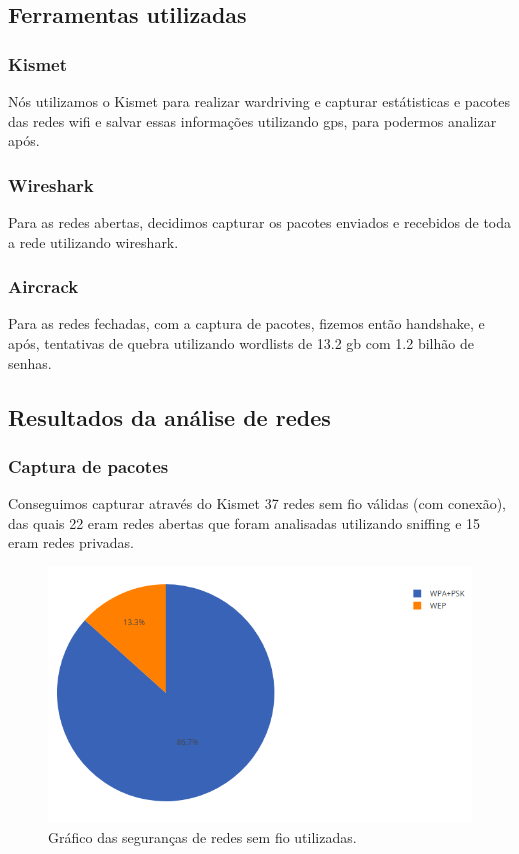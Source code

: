 \documentclass[
	article,			%
	12pt,				%
	oneside,			%
	a4paper,			%
	english,			%
	brazil,				%
	sumario=tradicional
	]{abntex2}
\begin{document}
\subsection{Ferramentas utilizadas}

\subsubsection{Kismet}

Nós utilizamos o Kismet para realizar wardriving e capturar estátisticas e pacotes das redes wifi e salvar essas informações utilizando gps, para podermos analizar após.

\subsubsection{Wireshark}

Para as redes abertas, decidimos capturar os pacotes enviados e recebidos de toda a rede utilizando wireshark.

\subsubsection{Aircrack}

Para as redes fechadas, com a captura de pacotes, fizemos então handshake, e após, tentativas de quebra utilizando wordlists de 13.2 gb com 1.2 bilhão de senhas.

\subsection{Resultados da análise de redes}

\subsubsection{Captura de pacotes}

Conseguimos capturar através do Kismet 37 redes sem fio válidas (com conexão), das quais 22 eram redes abertas que foram analisadas utilizando sniffing e 15 eram redes privadas.

\begin{figure}[H]
	\centering
	\caption{Gráfico das seguranças de redes sem fio utilizadas.}
	\includegraphics[scale=0.7]{graficopie-seguranca-redes}
\end{figure}
\end{document}
